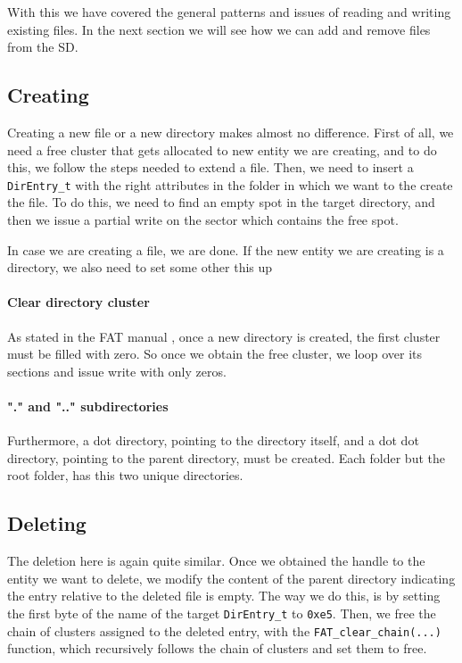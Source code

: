 \documentclass[a4paper,twoside,openright]{report}
\renewcommand{\t}[1]{%
	{\texttt{#1}}}
\begin{document}
With this we have covered the general patterns and issues of reading and writing existing files.
In the next section we will see how we can add and remove files from the SD.

\subsection{Creating}
\label{sub:fs_creating}
Creating a new file or a new directory makes almost no difference.
First of all, we need a free cluster that gets allocated to new entity we are creating, and to do this, we follow the steps needed to extend a file.
Then, we need to insert a \t{DirEntry\_t} with the right attributes in the folder in which we want to the create the file.
To do this, we need to find an empty spot in the target directory, and then we issue a partial write on the sector which contains the free spot.

In case we are creating a file, we are done.
If the new entity we are creating is a directory, we also need to set some other this up
\paragraph{Clear directory cluster}
As stated in the FAT manual \cite{FAT}, once a new directory is created, the first cluster must be filled with zero.
So once we obtain the free cluster, we loop over its sections and issue write with only zeros.

\paragraph{"." and ".." subdirectories}
Furthermore, a dot directory, pointing to the directory itself, and a dot dot directory, pointing to the parent directory, must be created.
Each folder but the root folder, has this two unique directories.

\subsection{Deleting}
The deletion here is again quite similar.
Once we obtained the handle to the entity we want to delete, we modify the content of the parent directory indicating the entry relative to the deleted file is empty.
The way we do this, is by setting the first byte of the name of the target \t{DirEntry\_t} to \t{0xe5}.
Then, we free the chain of clusters assigned to the deleted entry, with the \t{FAT\_clear\_chain(...)} function, which recursively follows the chain of clusters and set them to free.
\end{document}
